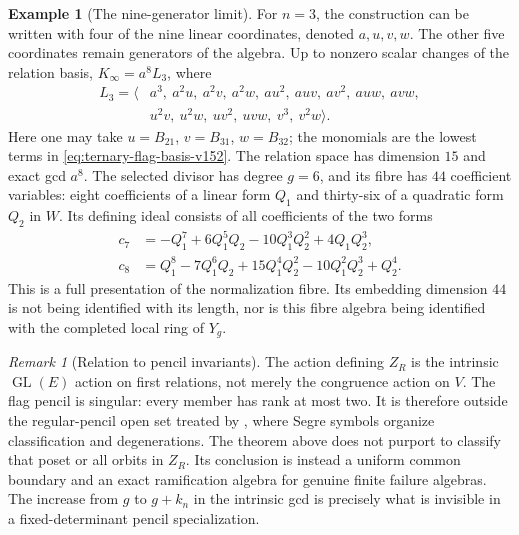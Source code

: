 \documentclass[11pt,reqno]{amsart}
\numberwithin{equation}{section}
\theoremstyle{definition}\newtheorem{definition}[theorem]{Definition}
\newtheorem{example}[theorem]{Example}
\theoremstyle{remark}\newtheorem{remark}[theorem]{Remark}
\begin{document}
\begin{example}[The nine-generator limit]\label{ex:n3-boundary-v152}
For $n=3$, the construction can be written with four of the nine
linear coordinates, denoted $a,u,v,w$.  The other five coordinates
remain generators of the algebra.  Up to nonzero scalar changes
of the relation basis, $K_\infty=a^8L_3$, where
\begin{equation}\label{eq:n3-limit-v152}
\begin{split}
 L_3=\langle& a^3,\ a^2u,\ a^2v,\ a^2w,\ au^2,\ auv,\ av^2,
             \ auw,\ avw,\\
            &u^2v,\ u^2w,\ uv^2,\ uvw,\ v^3,\ v^2w\rangle.
\end{split}
\end{equation}
Here one may take $u=B_{21}$, $v=B_{31}$, $w=B_{32}$; the monomials
are the lowest terms in \eqref{eq:ternary-flag-basis-v152}.
The relation space has dimension $15$ and exact gcd $a^8$.
The selected divisor has degree $g=6$, and its fibre has $44$
coefficient variables: eight coefficients of a linear form $Q_1$
and thirty-six of a quadratic form $Q_2$ in $W$.
Its defining ideal consists of all coefficients of the two forms
\begin{align*}
 c_7&=-Q_1^7+6Q_1^5Q_2-10Q_1^3Q_2^2+4Q_1Q_2^3,\\
 c_8&=Q_1^8-7Q_1^6Q_2+15Q_1^4Q_2^2-10Q_1^2Q_2^3+Q_2^4.
\end{align*}
This is a full presentation of the normalization fibre.  Its embedding
dimension $44$ is not being identified with its length, nor is this
fibre algebra being identified with the completed local ring of $Y_g$.
\end{example}

\begin{remark}[Relation to pencil invariants]\label{rem:segre-boundary-v152}
The action defining $Z_R$ is the intrinsic $\operatorname{GL}(E)$
action on first relations, not merely the congruence action on $V$.
The flag pencil is singular: every member has rank at most two.
It is therefore outside the regular-pencil open set treated by
\cite[Theorem~1.1 and \S5]{FevolaMandelshtamSturmfels}, where Segre
symbols organize classification and degenerations.  The theorem
above does not purport to classify that poset or all orbits in $Z_R$.
Its conclusion is instead a uniform common boundary and an exact
ramification algebra for genuine finite failure algebras.  The
increase from $g$ to $g+k_n$ in the intrinsic gcd is precisely what
is invisible in a fixed-determinant pencil specialization.
\end{remark}
\end{document}

